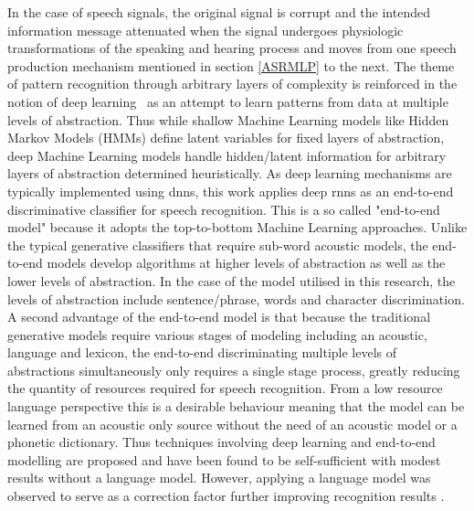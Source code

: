  In the case of speech signals, the original signal is corrupt and  the intended information message attenuated when the signal undergoes physiologic transformations of the speaking and hearing process and moves from one speech production mechanism mentioned in section \ref{ASRMLP} to the next.  The theme of pattern recognition through arbitrary layers of complexity is reinforced in the notion of deep learning~\cite{deng2014deep} as an attempt to learn patterns from data at multiple levels of abstraction. Thus while shallow Machine Learning models like Hidden Markov Models (HMMs) define latent variables for fixed layers of abstraction, deep Machine Learning models handle hidden/latent information for arbitrary layers of abstraction determined heuristically.  As deep learning mechanisms are typically implemented using \acrlong{dnn}s, this work applies deep \acrlong{rnn}s as an end-to-end discriminative classifier for speech recognition.  This is a so called "end-to-end model" because it adopts the top-to-bottom Machine Learning approaches. Unlike the typical generative classifiers that require sub-word acoustic models, the end-to-end models develop algorithms at higher levels of abstraction as well as the lower levels of abstraction. In the case of the model utilised in this research, the levels of abstraction include sentence/phrase, words and character discrimination. A second advantage of the end-to-end model is that because the traditional generative models require various stages of modeling including an acoustic, language and lexicon, the end-to-end discriminating multiple levels of abstractions simultaneously only requires a single stage process, greatly reducing the quantity of resources required for speech recognition.  From a low resource language perspective this is a desirable behaviour meaning that the model can be learned from an acoustic only source without the need of an acoustic model or a phonetic dictionary.   Thus techniques involving deep learning and end-to-end modelling are proposed and have been found to be self-sufficient \citep{hannun2014deep} with modest results without a language model.  However, applying a language model was observed to serve as a correction factor further improving recognition results \citep{hannun2014deep}. 

